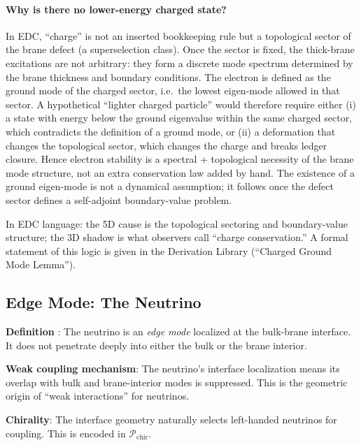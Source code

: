 \paragraph{Why is there no lower-energy charged state?}
In EDC, ``charge'' is not an inserted bookkeeping rule but a topological sector of the
brane defect (a superselection class). Once the sector is fixed, the thick-brane
excitations are not arbitrary: they form a discrete mode spectrum determined by the
brane thickness and boundary conditions. The electron is defined as the ground mode
of the charged sector, i.e.\ the lowest eigen-mode allowed in that sector. A hypothetical
``lighter charged particle'' would therefore require either (i) a state with energy
below the ground eigenvalue within the same charged sector, which contradicts the
definition of a ground mode, or (ii) a deformation that changes the topological sector,
which changes the charge and breaks ledger closure. Hence electron stability is a
spectral + topological necessity of the brane mode structure, not an extra conservation
law added by hand. The existence of a ground eigen-mode is not a dynamical assumption;
it follows once the defect sector defines a self-adjoint boundary-value problem.

In EDC language: the 5D cause is the topological sectoring and boundary-value structure;
the 3D shadow is what observers call ``charge conservation.'' A formal statement of
this logic is given in the Derivation Library (``Charged Ground Mode Lemma'').

\subsection{Edge Mode: The Neutrino}

\begin{tcolorbox}[mechanism, title={Neutrino Ontology}]
\textbf{Definition} \tagP{}: The neutrino is an \emph{edge mode} localized at the
bulk-brane interface. It does not penetrate deeply into either the bulk or the
brane interior.

\textbf{Weak coupling mechanism}: The neutrino's interface localization means its
overlap with bulk and brane-interior modes is suppressed. This is the geometric
origin of ``weak interactions'' for neutrinos.

\textbf{Chirality}: The interface geometry naturally selects left-handed neutrinos
for coupling. This is encoded in $\mathcal{P}_{\text{chir}}$.
\end{tcolorbox}

